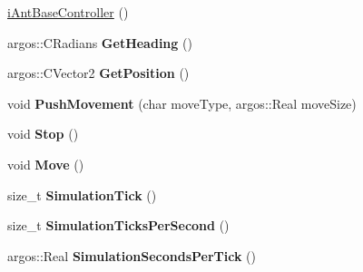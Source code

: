 \begin{DoxyCompactItemize}
\item 
\hyperlink{classi_ant_base_controller_a39d8d48963c82c29e7c943e431782d9a}{i\+Ant\+Base\+Controller} ()
\item 
\hypertarget{classi_ant_base_controller_ad42ec34c309ab33a650b7f28defc490e}{}argos\+::\+C\+Radians {\bfseries Get\+Heading} ()\label{classi_ant_base_controller_ad42ec34c309ab33a650b7f28defc490e}

\item 
\hypertarget{classi_ant_base_controller_aadadf8a3f8fbc5844428ec000a61ea6b}{}argos\+::\+C\+Vector2 {\bfseries Get\+Position} ()\label{classi_ant_base_controller_aadadf8a3f8fbc5844428ec000a61ea6b}

\item 
\hypertarget{classi_ant_base_controller_a27f63778f8fce4febcab7624f768cb0c}{}void {\bfseries Push\+Movement} (char move\+Type, argos\+::\+Real move\+Size)\label{classi_ant_base_controller_a27f63778f8fce4febcab7624f768cb0c}

\item 
\hypertarget{classi_ant_base_controller_a6e787198db6760b91130e3ec34038e1d}{}void {\bfseries Stop} ()\label{classi_ant_base_controller_a6e787198db6760b91130e3ec34038e1d}

\item 
\hypertarget{classi_ant_base_controller_af56e1a91b585793bcc877ee8b8f86d09}{}void {\bfseries Move} ()\label{classi_ant_base_controller_af56e1a91b585793bcc877ee8b8f86d09}

\item 
\hypertarget{classi_ant_base_controller_ac30e46e9048ce888af15fde012f9ba4e}{}size\+\_\+t {\bfseries Simulation\+Tick} ()\label{classi_ant_base_controller_ac30e46e9048ce888af15fde012f9ba4e}

\item 
\hypertarget{classi_ant_base_controller_aef393e9abb3037572f68f8c6884cfab3}{}size\+\_\+t {\bfseries Simulation\+Ticks\+Per\+Second} ()\label{classi_ant_base_controller_aef393e9abb3037572f68f8c6884cfab3}

\item 
\hypertarget{classi_ant_base_controller_a6a5c40fe9e57d61a50ff58abda6cda48}{}argos\+::\+Real {\bfseries Simulation\+Seconds\+Per\+Tick} ()\label{classi_ant_base_controller_a6a5c40fe9e57d61a50ff58abda6cda48}

\end{DoxyCompactItemize}
